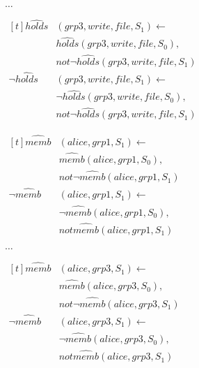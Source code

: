 \documentclass[global,twocolumn,draft]{svjour}
\newenvironment{vexample}
  {\begin{example}\hspace{0.25em}}
  {\end{example}}
\begin{document}
\begin{vexample}
\begin{enumerate}
              $\ldots$

              \begin{math}
                \begin{aligned}[t]
                  \hat{holds}&(grp3, write, file, S_{1}) \leftarrow \\
                  & \hat{holds}(grp3, write, file, S_{0}), \\
                  & not \lnot \hat{holds}(grp3, write, file, S_{1}) \\
                  \lnot \hat{holds}&(grp3, write, file, S_{1}) \leftarrow \\
                  & \lnot \hat{holds}(grp3, write, file, S_{0}), \\
                  & not \lnot \hat{holds}(grp3, write, file, S_{1})
                \end{aligned}
              \end{math}

              \begin{math}
                \begin{aligned}[t]
                  \hat{memb}&(alice, grp1, S_{1}) \leftarrow \\
                  & \hat{memb}(alice, grp1, S_{0}), \\
                  & not \lnot \hat{memb}(alice, grp1, S_{1}) \\
                  \lnot \hat{memb}&(alice, grp1, S_{1}) \leftarrow \\
                  & \lnot \hat{memb}(alice, grp1, S_{0}), \\
                  & not \hat{memb}(alice, grp1, S_{1})
                \end{aligned}
              \end{math}

              $\ldots$

              \begin{math}
                \begin{aligned}[t]
                  \hat{memb}&(alice, grp3, S_{1}) \leftarrow \\
                  & \hat{memb}(alice, grp3, S_{0}), \\
                  & not \lnot \hat{memb}(alice, grp3, S_{1}) \\
                  \lnot \hat{memb}&(alice, grp3, S_{1}) \leftarrow \\
                  & \lnot \hat{memb}(alice, grp3, S_{0}), \\
                  & not \hat{memb}(alice, grp3, S_{1})
                \end{aligned}
              \end{math}


\end{enumerate}
\end{vexample}
\end{document}
